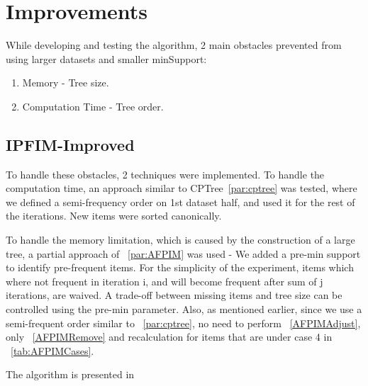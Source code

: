 
\section{Improvements}
\label{sec:improvements}

While developing and testing the algorithm, 2 main obstacles prevented from using larger datasets and smaller minSupport:
\begin{enumerate}
	\item Memory - Tree size.
	\item Computation Time - Tree order.
\end{enumerate}

\subsection{IPFIM-Improved}
To handle these obstacles, 2 techniques were implemented.
To handle the computation time, an approach similar to CPTree~\ref{par:cptree} was tested, where we defined a semi-frequency order on 1st dataset half, and used it for the rest of the iterations. New items were sorted canonically.

To handle the memory limitation, which is caused by the construction of a large tree, a partial approach of ~\ref{par:AFPIM} was used - We added a pre-min support to identify pre-frequent items. For the simplicity of the experiment, items which where not frequent in iteration i, and will become frequent after sum of j iterations, are waived. A trade-off between missing items and tree size can be controlled using the pre-min parameter.  Also, as mentioned earlier, since we use a semi-frequent order similar to ~\ref{par:cptree}, no need to perform ~\ref{AFPIMAdjust}, only ~\ref{AFPIMRemove} and recalculation for items that are under case 4 in ~\ref{tab:AFPIMCases}.

The algorithm is presented in 

